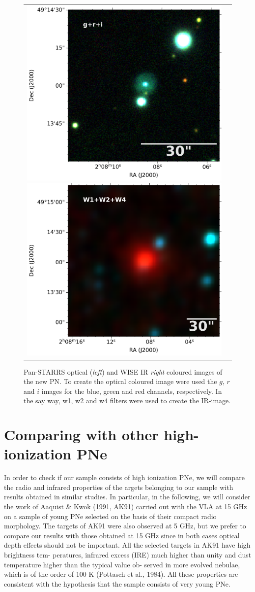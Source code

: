 \documentclass[fleqn,usenatbib]{mnras}
\begin{document}
\begin{figure}
  \centering
  \begin{tabular}{l l}
\includegraphics[width=0.5\linewidth]{Figs/cutout_rings_v3_skycell_2294_031_stk_i_unconv-irg-RGB.pdf}
\includegraphics[width=0.5\linewidth]{Figs/w4_ra32_035994_dec49_233615-421-RGB.pdf}
\end{tabular}  
  \caption{Pan-STARRS optical (\textit{left}) and WISE IR \textit{right} coloured
    images of the new PN. To create the optical coloured image were used the $g$, $r$ and $i$
    images for the blue, green and red channels, respectively. In the say way, w1, w2 and w4
    filters were used to create the IR-image.} 
  \label{fig:image}
\end{figure}


\section{Comparing with other high-ionization PNe}
\label{sec:comp}

In order to check if our sample consists of high ionization PNe,
we will compare the radio and infrared properties of the
argets belonging to our sample with results obtained in
similar studies. In particular, in the following, we will
consider the work of Aaquist & Kwok (1991, AK91) carried
out with the VLA at 15 GHz on a sample of young PNe
selected on the basis of their compact radio morphology.
The targets of AK91 were also observed at 5 GHz, but
we prefer to compare our results with those obtained at
15 GHz since in both cases optical depth effects should
not be important.
All the selected targets in AK91 have high brightness tem-
peratures, infrared excess (IRE) much higher than unity
and dust temperature higher than the typical value ob-
served in more evolved nebulae, which is of the order of
100 K (Pottasch et al., 1984). All these properties are
consistent with the hypothesis that the sample consists of
very young PNe.
\end{document}
